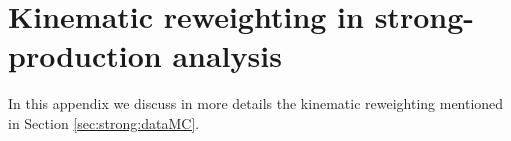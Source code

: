 \chapter{Kinematic reweighting in strong-production analysis}
\label{app:meffrw}

In this appendix we discuss in more details the kinematic reweighting mentioned in Section \ref{sec:strong:dataMC}.


